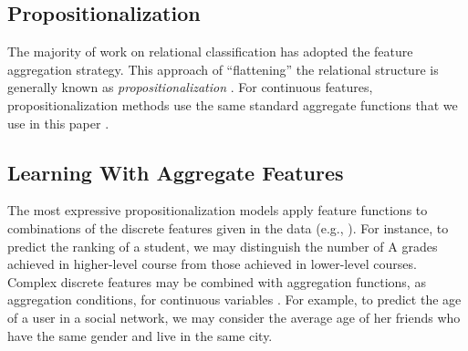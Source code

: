 \documentclass[conference]{IEEEtran}
\begin{document}
\subsection{Propositionalization} The majority of work on relational classification has adopted the feature aggregation strategy.
This approach of ``flattening'' the relational structure is generally known as {\em propositionalization} \cite{Kramer2000}. %
%
For continuous features, propositionalization methods use the same standard aggregate functions that we use in this paper \cite{Krogel2002,C.Vens2004}.

\subsection{Learning With Aggregate Features} The most expressive propositionalization models apply feature functions to combinations of the discrete features given in the data (e.g., \cite{Kuzelka2011}). For instance, to predict the ranking of a student, we may distinguish the number of A grades achieved in higher-level course from those achieved in lower-level courses. Complex discrete features may be combined with aggregation functions, as aggregation conditions, for continuous variables  \cite{C.Vens2004,Popescul2007}. For example, to predict the age of a user in a social network, we may consider the average age of her friends who have the same gender and live in the same city.
\end{document}
